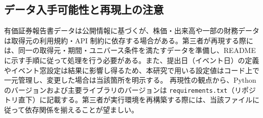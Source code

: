 \subsection{データ入手可能性と再現上の注意}

有価証券報告書データは公開情報に基づくが、株価・出来高や一部の財務データは取得元の利用規約・API 制約に依存する場合がある。第三者が再現する際には、同一の取得元・期間・ユニバース条件を満たすデータを準備し、README に示す手順に従って処理を行う必要がある。また、提出日（イベント日）の定義やイベント窓設定は結果に影響し得るため、本研究で用いる設定値はコード上で一元管理し、変更した場合は当該箇所を明示する。
\medskip
再現性の観点から、Python のバージョンおよび主要ライブラリのバージョンは \texttt{requirements.txt}（リポジトリ直下）に記載する。第三者が実行環境を再構築する際には、当該ファイルに従って依存関係を揃えることが望ましい。
